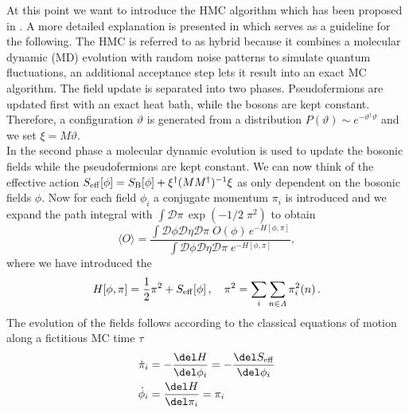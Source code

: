 %
At this point we want to introduce the HMC algorithm which has been proposed in \cite{hmc}. A more detailed explanation is presented in \cite{gattringer2009quantum,montvay_lattice} which serves as a guideline for the following. The HMC is referred to as hybrid because it combines a molecular dynamic (MD) evolution with random noise patterns to simulate quantum fluctuations, an additional  acceptance step lets it result into an exact MC algorithm. The field update is  separated into two phases. Pseudofermions are updated first with an exact heat bath, while the bosons are kept constant. Therefore, a configuration $\vartheta$ is generated from a  distribution $P(\vartheta) \sim e^{-\vartheta^{\dagger}\vartheta}$ and we set $\xi = M\vartheta$.\\
In the second phase a molecular dynamic evolution is used to update the bosonic fields while the pseudofermions are kept constant.  We can now think of the effective action $S_{\rm eff}[\phi]= S_{\rm B}[\phi] + \xi^{\dagger}(MM^{\dagger})^{-1}\xi$ as only dependent on the bosonic fields $\phi$. Now for each field $\phi_{i}$ a conjugate momentum $\pi_{i}$ is introduced and we expand the path integral with $\int \mathcal{D}\pi\, \exp(-1/2 \;\pi^{2})$ to obtain
%
%
\begin{equation}
\langle O \rangle = \dfrac{\int \mathcal{D}\phi \mathcal{D}\eta \mathcal{D}\pi\;  O(\phi) \,e^{-H[\phi,\pi]}}{\int \mathcal{D}\phi \mathcal{D}\eta \mathcal{D}\pi\;  e^{-H[\phi,\pi]}},
\end{equation}
where we have introduced the 
%
%
\begin{equation}
H[\phi,\pi] = \frac{1}{2}\pi^{2} + S_{\rm eff}[\phi]\, , \quad \pi^{2}=\sum\limits_{i}\sum\limits_{n\in \mathit{\Lambda}}\pi_{i}^{2}(n)\, .
\end{equation}
%
%
The evolution of the fields follows according to the classical equations of motion along a fictitious MC time $\tau$
%
%
\begin{align}
\dot{\pi}_{i} &=-\frac{\del H}{\del \phi_{i}} = -\frac{\del S_{\rm eff}}{\del \phi_{i}} \notag \\
\dot{\phi}_{i} &= \frac{\del H}{\del \pi_{i}} = \pi_{i}
\label{ham_eom}
\end{align}
%
%
